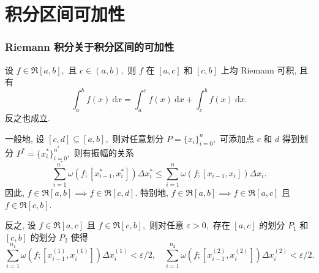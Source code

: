 
\section{积分区间可加性}


\begin{frame}
\frametitle{Riemann 积分关于积分区间的可加性}

\begin{prop}[区间可加性]
设 $f \in \mathfrak{R}[a, b],$ 且 $c \in (a, b),$ 则 $f$ 在 $[a, c]$ 和 $[c, b]$ 上均 Riemann 可积, 且有
\[
\int_a^b f(x) ~ \mathrm{d} x = \int_a^c f(x) ~ \mathrm{d} x + \int_c^b f(x) ~ \mathrm{d} x.
\]
反之也成立.
\end{prop}

\pause
\vspace{1em}

\startproof[bg=yellow, fg=red]
一般地, 设 $[c, d] \subseteq [a, b],$ 则对任意划分 $P = \{x_i\}_{i=0}^n,$ 可添加点 $c$ 和 $d$ 得到划分 $P^* = \{x_i^*\}_{i=0}^{n^*},$ 则有振幅的关系
\[
\sum_{i=1}^{n^*} \omega(f; [x_{i-1}^*, x_i^*]) \Delta x_i^* \leqslant \sum_{i=1}^n \omega(f; [x_{i-1}, x_i]) \Delta x_i.
\]
因此, $f \in \mathfrak{R}[a, b] \implies f \in \mathfrak{R}[c, d].$ 特别地, $f \in \mathfrak{R}[a, b] \implies f \in \mathfrak{R}[a, c]$ 且 $f \in \mathfrak{R}[c, b].$

\pause
\vspace{1em}

反之, 设 $f \in \mathfrak{R}[a, c]$ 且 $f \in \mathfrak{R}[c, b],$ 则对任意 $\varepsilon > 0,$ 存在 $[a, c]$ 的划分 $P_1$ 和 $[c, b]$ 的划分 $P_2$ 使得
\[
\sum_{i=1}^{n_1} \omega(f; [x_{i-1}^{(1)}, x_i^{(1)}]) \Delta x_i^{(1)} < \varepsilon / 2, \quad \sum_{i=1}^{n_2} \omega(f; [x_{i-1}^{(2)}, x_i^{(2)}]) \Delta x_i^{(2)} < \varepsilon / 2.
\]

\end{frame}


